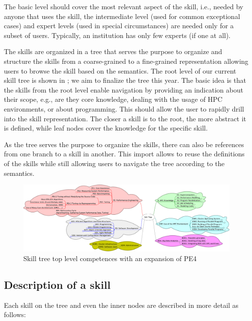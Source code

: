 \documentclass[jocse]{jocseart}
\begin{document}
The basic level should cover the most relevant aspect of the skill, i.e., needed by anyone that uses the skill, the intermediate level (used for common exceptional cases) and expert levels (used in special circumstances)  are needed only for a subset of users.
Typically, an institution has only few experts (if one at all).

The skills are organized in a tree that serves the purpose to organize and structure the skills from a coarse-grained to a fine-grained representation allowing users to browse the skill based on the semantics.
The root level of our current skill tree is shown in ; we aim to finalize the tree this year.
The basic idea is that the skills from the root level enable navigation by providing an indication about their scope, e.g., are they core knowledge, dealing with the usage of HPC environments, or about programming.
This should allow the user to rapidly drill into the skill representation.
The closer a skill is to the root, the more abstract it is defined, while leaf nodes cover the knowledge for the specific skill.


As the tree serves the purpose to organize the skills, there can also be references from one branch to a skill in another.
This import allows to reuse the definitions of the skills while still allowing users to navigate the tree according to the semantics.

\begin{figure}[tb!]
	\centering
	\includegraphics[width=15.0cm]{skill-tree}
	\caption{Skill tree top level competences with an expansion of PE4}
	\label{fig:skill-tree}
\end{figure}

\subsection{Description of a skill}

Each skill on the tree and even the inner nodes are described in more detail as follows:
\end{document}

